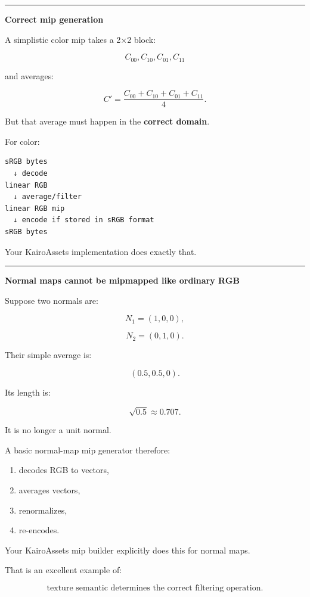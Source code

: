 \begin{center}\rule{0.5\linewidth}{0.5pt}\end{center}

\textbf{Correct mip generation}

A simplistic color mip takes a 2×2 block:

\[
C_{00},C_{10},C_{01},C_{11}
\]

and averages:

\[
C'=
\frac{
C_{00}+C_{10}+C_{01}+C_{11}
}{4}.
\]

But that average must happen in the \textbf{correct domain}.

For color:

\begin{verbatim}
sRGB bytes
  ↓ decode
linear RGB
  ↓ average/filter
linear RGB mip
  ↓ encode if stored in sRGB format
sRGB bytes
\end{verbatim}

Your KairoAssets implementation does exactly that.

\begin{center}\rule{0.5\linewidth}{0.5pt}\end{center}

\textbf{Normal maps cannot be mipmapped like ordinary RGB}

Suppose two normals are:

\[
N_1=(1,0,0),
\]

\[
N_2=(0,1,0).
\]

Their simple average is:

\[
(0.5,0.5,0).
\]

Its length is:

\[
\sqrt{0.5}
\approx0.707.
\]

It is no longer a unit normal.

A basic normal-map mip generator therefore:

\begin{enumerate}
\def\labelenumi{\arabic{enumi}.}
\tightlist
\item
  decodes RGB to vectors,
\item
  averages vectors,
\item
  renormalizes,
\item
  re-encodes.
\end{enumerate}

Your KairoAssets mip builder explicitly does this for normal maps.

That is an excellent example of:

\[
\boxed{
\text{texture semantic determines the correct filtering operation}.
}
\]

